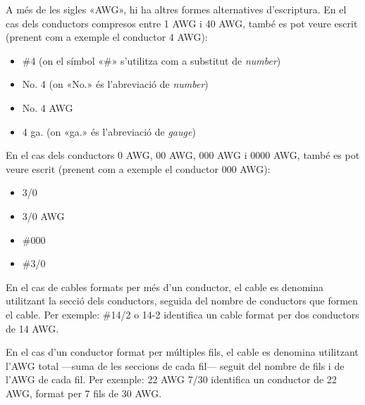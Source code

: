 A més de les sigles «AWG», hi ha altres formes alternatives d'escriptura. En el cas dels conductors compresos entre 1 AWG i 40 AWG, també es pot veure escrit (prenent com a exemple el conductor 4 AWG):
\begin{itemize}
   \item \#4 (on el símbol «\#» s'utilitza com a substitut de \textit{number})
   \item No. 4 (on «No.» és l'abreviació de \textit{number})
   \item No. 4 AWG
   \item 4 ga. (on «ga.» és l'abreviació de \textit{gauge})
\end{itemize}

En el cas dels conductors 0 AWG, 00 AWG, 000 AWG i 0000 AWG, també es pot veure escrit (prenent com a exemple el conductor 000 AWG):
\begin{itemize}
   \item 3/0
   \item 3/0 AWG
   \item \#000
   \item \#3/0
\end{itemize}


En el cas de cables formats per més d'un conductor, el cable es denomina utilitzant la secció dels conductors, seguida del nombre de conductors que formen el cable. Per exemple: \#14/2 o 14-2 identifica un cable format per dos conductors de 14 AWG.

En el cas d'un conductor format per múltiples fils, el cable es denomina utilitzant l'AWG total ---suma de les seccions de cada fil--- seguit del nombre de fils i de l'AWG de cada fil. Per exemple: 22 AWG 7/30 identifica un conductor de 22 AWG, format per 7 fils de  30 AWG.

